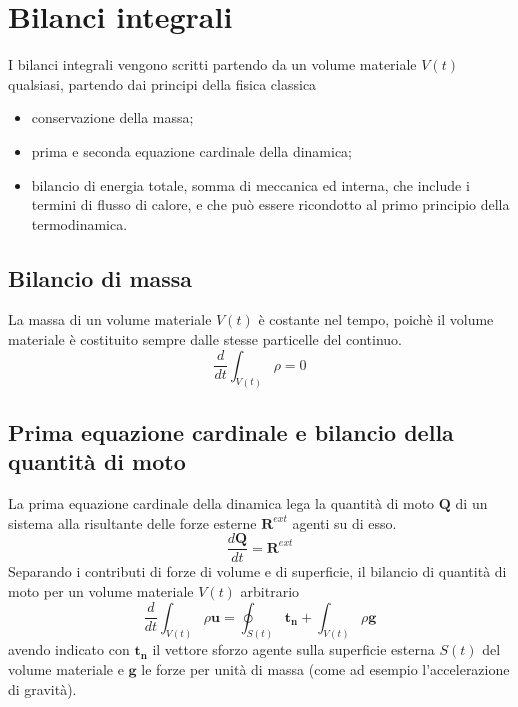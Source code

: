  \newpage

\section{Bilanci integrali}
I bilanci integrali vengono scritti partendo da un volume materiale $V(t)$ qualsiasi, partendo dai principi della fisica classica
\begin{itemize}
  \item conservazione della massa;
  \item prima e seconda equazione cardinale della dinamica;
  \item bilancio di energia totale, somma di meccanica ed interna, che include i termini di flusso di calore, e che può essere
        ricondotto al primo principio della termodinamica.
\end{itemize}

\subsection{Bilancio di massa}
 La massa di un volume materiale $V(t)$ è costante nel tempo, poichè il volume materiale è costituito sempre dalle stesse particelle del
 continuo.
\begin{equation}
 \dfrac{d}{dt} \int_{V(t)} \rho = 0
\end{equation}

\subsection{Prima equazione cardinale e bilancio della quantità di moto}
La prima equazione cardinale della dinamica lega la quantità di moto $\bm{Q}$ di un sistema alla risultante delle forze esterne $\bm{R}^{ext}$
 agenti su di esso.
\begin{equation}
 \dfrac{d\bm{Q}}{d t} = \bm{R}^{ext}
\end{equation}
Separando i contributi di forze di volume e di superficie, il bilancio di quantità di moto per un volume materiale $V(t)$ arbitrario
\begin{equation}
 \dfrac{d}{d t} \int_{V(t)} \rho \bm{u} = \oint_{S(t)} \bm{t_n} + \int_{V(t)} \rho \bm{g}
\end{equation}
avendo indicato con $\bm{t_n}$ il vettore sforzo agente sulla superficie esterna $S(t)$ del volume materiale e $\bm{g}$ le forze per unità di
 massa (come ad esempio l'accelerazione di gravità).

